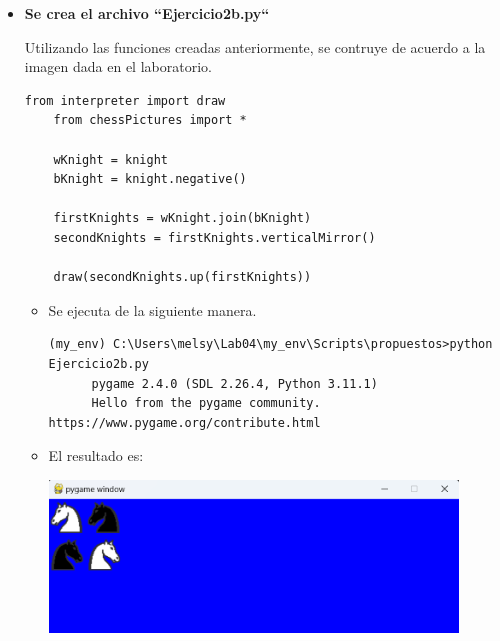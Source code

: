 \documentclass{article}
\begin{document}
\begin{itemize}
  \pagebreak

  \item \textbf{Se crea el archivo ``Ejercicio2b.py``}
  
  Utilizando las funciones creadas anteriormente, se contruye de acuerdo a la imagen dada en el laboratorio.

  \vspace{\baselineskip}

    \begin{lstlisting}[style=python]
    from interpreter import draw
    from chessPictures import *

    wKnight = knight
    bKnight = knight.negative()

    firstKnights = wKnight.join(bKnight)
    secondKnights = firstKnights.verticalMirror()

    draw(secondKnights.up(firstKnights))
    \end{lstlisting}

    \vspace{\baselineskip}

    \begin{itemize}
      \item Se ejecuta de la siguiente manera.

      \begin{lstlisting}[style=shell]
      (my_env) C:\Users\melsy\Lab04\my_env\Scripts\propuestos>python Ejercicio2b.py
      pygame 2.4.0 (SDL 2.26.4, Python 3.11.1)
      Hello from the pygame community. https://www.pygame.org/contribute.html
      \end{lstlisting}

      \vspace{2\baselineskip}

      \item El resultado es:
      
      \vspace{\baselineskip}

      \begin{minipage}{\linewidth}
        \centering
        \includegraphics[width=0.9\textwidth]{imagenes/p_ej2b.png}
      \end{minipage}
    \end{itemize}


\end{itemize}
\end{document}
